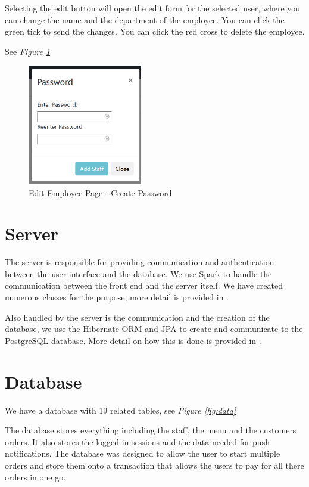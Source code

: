 \documentclass[12pt, twoside, a4paper]{report}
\begin{document}
Selecting the edit button will open the edit form for the selected user, where you can change the name and the department of the employee. You can click the green tick to send the changes. You can click the red cross to delete the employee.

See \textit{Figure \ref{fig:employee2}}
\begin{figure}[H]
  \centering
  \includegraphics[width=5cm]{employee2.png}
  \caption{Edit Employee Page - Create Password}
  \label{fig:employee2}
\end{figure}

\section*{Server}
The server is responsible for providing communication and authentication between the user interface and the database.
We use Spark to handle the communication between the front end and the server itself. We have created numerous classes for the purpose, more detail is provided in \textit{}.

Also handled by the server is the communication and the creation of the database, we use the Hibernate ORM and JPA to create and communicate to the PostgreSQL database. More detail on how this is done is provided in \textit{}.

\section*{Database}

We have a database with 19 related tables, see \textit{Figure \ref{fig:data}} 

The database stores everything including the staff, the menu and the customers orders. 
It also stores the logged in sessions and the data needed for push notifications.
The database was designed to allow the user to start multiple orders and store them onto a transaction that allows the users to pay for all there orders in one go.
\end{document}
